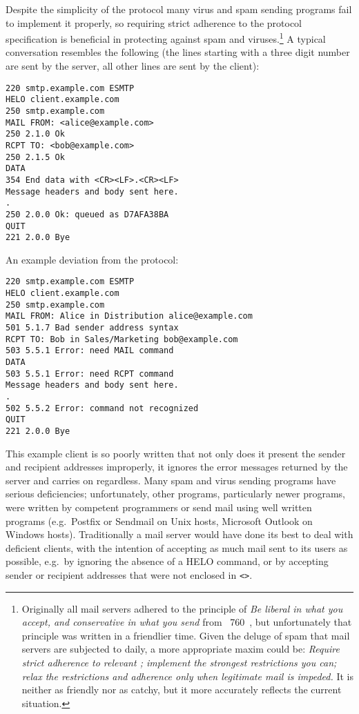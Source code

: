 \SMTPglossaryDescription{} Despite the simplicity of the protocol many
virus and spam sending programs fail to implement it properly, so requiring
strict adherence to the protocol specification is beneficial in protecting
against spam and viruses.\footnote{\label{footnote:rfc760}Originally all
mail servers adhered to the principle of \textit{Be liberal in what you
accept, and conservative in what you send\/} from
~760~\cite{rfc760}, but unfortunately that principle was
written in a friendlier time.  Given the deluge of spam that mail servers
are subjected to daily, a more appropriate maxim could be: \textit{Require
strict adherence to relevant ; implement the strongest
restrictions you can; relax the restrictions and adherence only when
legitimate mail is impeded.\/}  It is neither as friendly nor as catchy,
but it more accurately reflects the current situation.} A typical
 conversation resembles the following (the lines starting
with a three digit number are sent by the server, all other lines are sent
by the client):

\begin{verbatim}
220 smtp.example.com ESMTP
HELO client.example.com
250 smtp.example.com
MAIL FROM: <alice@example.com>
250 2.1.0 Ok
RCPT TO: <bob@example.com>
250 2.1.5 Ok
DATA
354 End data with <CR><LF>.<CR><LF>
Message headers and body sent here.
.
250 2.0.0 Ok: queued as D7AFA38BA
QUIT
221 2.0.0 Bye
\end{verbatim}

An example deviation from the protocol:

\begin{verbatim}
220 smtp.example.com ESMTP
HELO client.example.com
250 smtp.example.com
MAIL FROM: Alice in Distribution alice@example.com
501 5.1.7 Bad sender address syntax
RCPT TO: Bob in Sales/Marketing bob@example.com
503 5.5.1 Error: need MAIL command
DATA
503 5.5.1 Error: need RCPT command
Message headers and body sent here.
.
502 5.5.2 Error: command not recognized
QUIT
221 2.0.0 Bye
\end{verbatim}

This example client is so poorly written that not only does it present the
sender and recipient addresses improperly, it ignores the error messages
returned by the server and carries on regardless.  Many spam and virus
sending programs have serious deficiencies; unfortunately, other programs,
particularly newer programs, were written by competent programmers or send
mail using well written programs (e.g.\ Postfix or Sendmail on Unix hosts,
Microsoft Outlook on Windows hosts).  Traditionally a mail server would
have done its best to deal with deficient clients, with the intention of
accepting as much mail sent to its users as possible, e.g.\ by ignoring the
absence of a HELO command, or by accepting sender or recipient addresses
that were not enclosed in \texttt{<>}.

